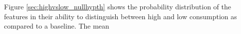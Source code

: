 Figure \ref{sec:highvslow_nullhypth} shows the probability distribution of the features in their ability to distinguish between high and low consumption as compared to a baseline. The mean